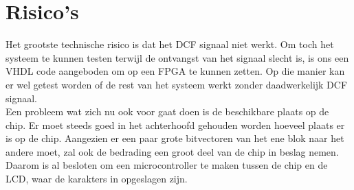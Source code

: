 \documentclass[11pt,twoside,a4paper]{article}
\begin{document}
\newpage
\section{Risico's}
Het grootste technische risico is dat het DCF signaal niet werkt. Om toch het systeem te kunnen testen terwijl de ontvangst van het signaal slecht is, is ons een VHDL code aangeboden om op een FPGA te kunnen zetten. Op die manier kan er wel getest worden of de rest van het systeem werkt zonder daadwerkelijk DCF signaal.\\
Een probleem wat zich nu ook voor gaat doen is de beschikbare plaats op de chip. Er moet steeds goed in het achterhoofd gehouden worden hoeveel plaats er is op de chip. Aangezien er een paar grote bitvectoren van het ene blok naar het andere moet, zal ook de bedrading een groot deel van de chip in beslag nemen. Daarom is al besloten om een microcontroller te maken tussen de chip en de LCD, waar de karakters in opgeslagen zijn.
\end{document}
